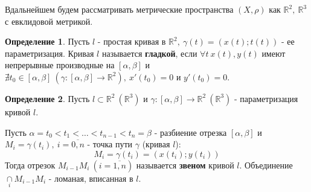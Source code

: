 \documentclass{report}
\theoremstyle{definition}
\newtheorem{definition}{Определение}[section]
\begin{document}
Вдальнейшем будем рассматривать метрические пространства $(X,\rho)$ как $\mathbb{R}^2, \ \mathbb{R}^3$
с евклидовой метрикой.

\begin{definition}
  Пусть $l$ - простая кривая в $\mathbb{R}^2, \ \gamma(t) = (x(t);t(t))$ - ее параметризация.
  Кривая $l$ называется \textbf{гладкой}, если $\forall t \ x(t),y(t)$ имеют непрерывные производные
  на $[\alpha,\beta]$ и $\nexists t_0 \in [\alpha,\beta] \ (\gamma : [\alpha,\beta] \rightarrow
    \mathbb{R}^2), \ x'(t_0)=0$ и $y'(t_0) = 0$.
\end{definition}

\begin{definition}
  Пусть $l \subset \mathbb{R}^2 \ (\mathbb{R}^3)$ и $\gamma:[\alpha,\beta]\rightarrow\mathbb{R}^2 \
    (\mathbb{R}^3)$ - параметризация кривой $l$.

  Пусть $\alpha = t_0 < t_1 < \ldots < t_{n-1} < t_n = \beta$ - разбиение отрезка $[\alpha,\beta]$
  и $M_i = \gamma(t_i), \ i=\overline{0,n}$ - точка пути $\gamma$ (кривая $l$):
  \begin{equation*}
    M_i = \gamma (t_i) = (x(t_i);y(t_i))
  \end{equation*}
  Тогда отрезок $M_{i-1}M_i \ (i = \overline{1,n})$ называется \textbf{звеном} кривой $l$.
  Объединение $\underset{i}{\cap}M_{i-1}M_i$ - ломаная, вписанная в $l$.


\end{definition}
\end{document}
